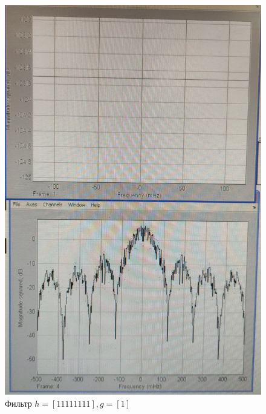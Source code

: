 \documentclass[a4paper, 12pt]{article}%
\begin{document}
\begin{enumerate}
\begin{figure}[h!]
        \begin{center}
            \begin{minipage}[h!]{0.48\linewidth}
                \includegraphics[width=1\linewidth]{images/3.3_1.jpg}
                \caption{Фильтр $h = [1 1 1 1 1 1 1 1], g = [1]$}
                \label{picture_2}
            \end{minipage}
            \hfill
            \begin{minipage}[h!]{0.48\linewidth}

\end{minipage}
\end{center}
\end{figure}
\end{enumerate}
\end{document}
